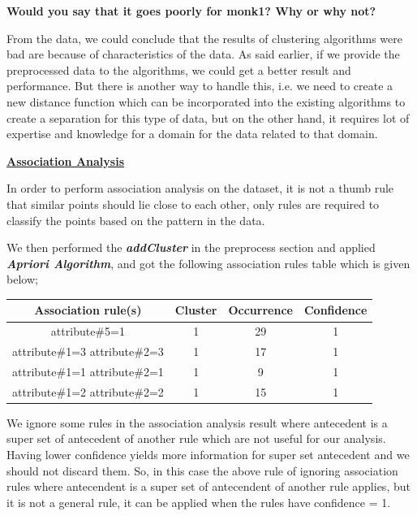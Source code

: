 \documentclass[a4paper,10pt]{article}
\begin{document}
\par
\textbf{Would you say that it goes poorly for monk1? Why or why not?} \par
From the data, we could conclude that the results of clustering algorithms were bad are because of
characteristics of the data. As said earlier, if we provide the preprocessed data to the algorithms,
we could get a better result and performance. But there is another way to handle this, i.e. we need 
to create a new distance function which can be incorporated into the existing algorithms to create
a separation for this type of data, but on the other hand, it requires lot of expertise and knowledge
for a domain for the data related to that domain.
\par
\textbf{\underline{Association Analysis}} \par
In order to perform association analysis on the dataset, it is not a thumb rule that similar points 
should lie close to each other, only rules are required to classify the points based on the pattern
in the data. \par

We then performed the \textbf{\textit{addCluster}} in the preprocess section and applied \textbf{\textit{Apriori 
Algorithm}}, and got the following association rules table which is given below; \par
\begin{center}
  \begin{tabular}{|c|c|c|c|}
    \hline
    \textbf{Association rule(s)} & \textbf{Cluster} & \textbf{Occurrence} & \textbf{Confidence} \\
    \hline
    attribute\#5=1 & 1 & 29 & 1 \\
    \hline
    attribute\#1=3 attribute\#2=3 & 1 & 17 & 1 \\
    \hline
    attribute\#1=1 attribute\#2=1 & 1 & 9 & 1 \\
    \hline
    attribute\#1=2 attribute\#2=2 & 1 & 15 & 1 \\
    \hline
  \end{tabular}
\end{center}
\par
We ignore some rules in the association analysis result where antecedent is a super set of antecedent of
another rule which are not useful for our analysis. Having lower confidence yields more information for
super set antecedent and we should not discard them. So, in this case the above rule of ignoring 
association rules where antecendent is a super set of antecendent of another rule applies, but it is not a
general rule, it can be applied when the rules have confidence = 1.
\end{document}
